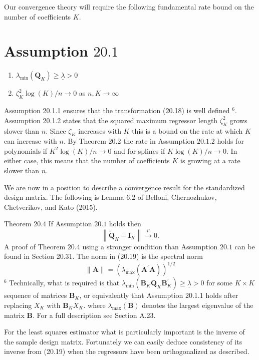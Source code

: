 \documentclass[10pt]{article}
\begin{document}
Our convergence theory will require the following fundamental rate bound on the number of coefficients $K$.

\section{Assumption $20.1$}
\begin{enumerate}
  \item $\lambda_{\min }\left(\boldsymbol{Q}_{K}\right) \geq \underline{\lambda}>0$

  \item $\zeta_{K}^{2} \log (K) / n \rightarrow 0$ as $n, K \rightarrow \infty$

\end{enumerate}
Assumption 20.1.1 ensures that the transformation (20.18) is well defined ${ }^{6}$. Assumption 20.1.2 states that the squared maximum regressor length $\zeta_{K}^{2}$ grows slower than $n$. Since $\zeta_{K}$ increases with $K$ this is a bound on the rate at which $K$ can increase with $n$. By Theorem $20.2$ the rate in Assumption $20.1 .2$ holds for polynomials if $K^{2} \log (K) / n \rightarrow 0$ and for splines if $K \log (K) / n \rightarrow 0$. In either case, this means that the number of coefficients $K$ is growing at a rate slower than $n$.

We are now in a position to describe a convergence result for the standardized design matrix. The following is Lemma $6.2$ of Belloni, Chernozhukov, Chetverikov, and Kato (2015).

Theorem $20.4$ If Assumption $20.1$ holds then
$$
\left\|\widetilde{\boldsymbol{Q}}_{K}-\boldsymbol{I}_{K}\right\| \stackrel{p}{\longrightarrow} 0 .
$$
A proof of Theorem $20.4$ using a stronger condition than Assumption $20.1$ can be found in Section 20.31. The norm in (20.19) is the spectral norm
$$
\|\boldsymbol{A}\|=\left(\lambda_{\max }\left(\boldsymbol{A}^{\prime} \boldsymbol{A}\right)\right)^{1 / 2}
$$
${ }^{6}$ Technically, what is required is that $\lambda_{\min }\left(\boldsymbol{B}_{K} \boldsymbol{Q}_{K} \boldsymbol{B}_{K}^{\prime}\right) \geq \underline{\lambda}>0$ for some $K \times K$ sequence of matrices $\boldsymbol{B}_{K}$, or equivalently that Assumption 20.1.1 holds after replacing $X_{K}$ with $\boldsymbol{B}_{K} X_{K}$. where $\lambda_{\max }(\boldsymbol{B})$ denotes the largest eigenvalue of the matrix $\boldsymbol{B}$. For a full description see Section A.23.

For the least squares estimator what is particularly important is the inverse of the sample design matrix. Fortunately we can easily deduce consistency of its inverse from (20.19) when the regressors have been orthogonalized as described.
\end{document}
